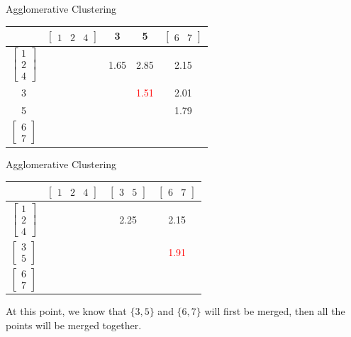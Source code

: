 \documentclass{beamer}
\begin{document}
	\begin{frame}{Agglomerative Clustering}
		\begin{table}[htbp]
			\begin{tabular}{c|cccc}
				& $\begin{bmatrix}1&2&4 \end{bmatrix}$ &3&5& $\begin{bmatrix}6&7 \end{bmatrix}$\\
				\hline
				$\begin{bmatrix}1\\2\\4 \end{bmatrix}$&&1.65&2.85&2.15\\
				3 &&&\textcolor{red}{1.51}&2.01\\
				5&&&&1.79\\
				$\begin{bmatrix}6\\7 \end{bmatrix}$&&&&\\ 
			\end{tabular}
		\end{table}
	\end{frame}
	
	\begin{frame}{Agglomerative Clustering}
		\begin{table}[htbp]
			\begin{tabular}{c|ccc}
				&$\begin{bmatrix}1&2&4 \end{bmatrix}$ & $\begin{bmatrix}3&5 \end{bmatrix}$&$\begin{bmatrix}6&7 \end{bmatrix}$\\
				\hline
				$\begin{bmatrix}1\\2\\4 \end{bmatrix}$ &&2.25&2.15\\
				$\begin{bmatrix}3\\5 \end{bmatrix}$ &&&\textcolor{red}{1.91}\\
				$\begin{bmatrix}6\\7 \end{bmatrix}$ &&&\\
			\end{tabular}
		\end{table}
	At this point, we know that $\{3,5\}$ and $\{6,7\}$ will first be merged, then all the points will be merged together.
	\end{frame}
	
\end{document}
